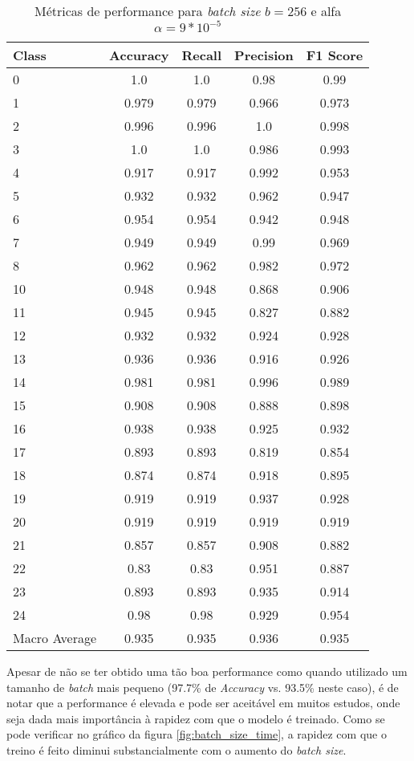\begin{table}[!t]
\caption{Métricas de performance para \textit{batch size} $b = 256$ e alfa $\alpha = 9 * 10^{-5}$}
\begin{center}
\begin{tabular}{l c c c c}
Class & Accuracy & Recall & Precision & F1 Score\\ \hline
0 & 1.0 & 1.0 & 0.98 & 0.99\\
1 & 0.979 & 0.979 & 0.966 & 0.973\\
2 & 0.996 & 0.996 & 1.0 & 0.998\\
3 & 1.0 & 1.0 & 0.986 & 0.993\\
4 & 0.917 & 0.917 & 0.992 & 0.953\\
5 & 0.932 & 0.932 & 0.962 & 0.947\\
6 & 0.954 & 0.954 & 0.942 & 0.948\\
7 & 0.949 & 0.949 & 0.99 & 0.969\\
8 & 0.962 & 0.962 & 0.982 & 0.972\\
10 & 0.948 & 0.948 & 0.868 & 0.906\\
11 & 0.945 & 0.945 & 0.827 & 0.882\\
12 & 0.932 & 0.932 & 0.924 & 0.928\\
13 & 0.936 & 0.936 & 0.916 & 0.926\\
14 & 0.981 & 0.981 & 0.996 & 0.989\\
15 & 0.908 & 0.908 & 0.888 & 0.898\\
16 & 0.938 & 0.938 & 0.925 & 0.932\\
17 & 0.893 & 0.893 & 0.819 & 0.854\\
18 & 0.874 & 0.874 & 0.918 & 0.895\\
19 & 0.919 & 0.919 & 0.937 & 0.928\\
20 & 0.919 & 0.919 & 0.919 & 0.919\\
21 & 0.857 & 0.857 & 0.908 & 0.882\\
22 & 0.83 & 0.83 & 0.951 & 0.887\\
23 & 0.893 & 0.893 & 0.935 & 0.914\\
24 & 0.98 & 0.98 & 0.929 & 0.954\\
\hline
Macro Average & 0.935 & 0.935 & 0.936 & 0.935\\
\end{tabular}
\label{tab: batch_alpha256}
\end{center}
\end{table}

Apesar de não se ter obtido uma tão boa performance como quando utilizado um tamanho de \textit{batch} mais pequeno (97.7\% de \textit{Accuracy} vs. 93.5\% neste caso), é de notar que a performance é elevada e pode ser aceitável em muitos estudos, onde seja dada mais importância à rapidez com que o modelo é treinado. Como se pode verificar no gráfico da figura \ref{fig:batch_size_time}, a rapidez com que o treino é feito diminui substancialmente com o aumento do \textit{batch size}.

